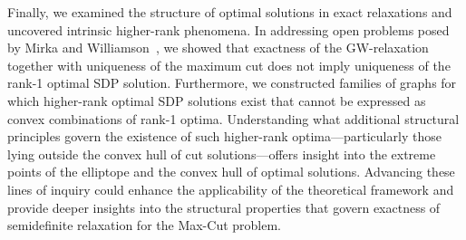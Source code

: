 \documentclass[a4paper,fleqn]{cas-sc}
\newcommand{\1}{\mathbf{1}}
\begin{document}
Finally, we examined the structure of optimal solutions in exact relaxations and uncovered intrinsic higher-rank phenomena. In addressing open problems posed by Mirka and Williamson~\citep{mirka2024max}, we showed that exactness of the GW-relaxation together with uniqueness of the maximum cut does not imply uniqueness of the rank-1 optimal SDP solution. Furthermore, we constructed families of graphs for which higher-rank optimal SDP solutions exist that cannot be expressed as convex combinations of rank-1 optima. Understanding what additional structural principles govern the existence of such higher-rank optima—particularly those lying outside the convex hull of cut solutions—offers insight into the extreme points of the elliptope and the convex hull of optimal solutions. Advancing these lines of inquiry could enhance the applicability of the theoretical framework and provide deeper insights into the structural properties that
govern exactness of semidefinite relaxation for the Max-Cut problem.



\end{document}
